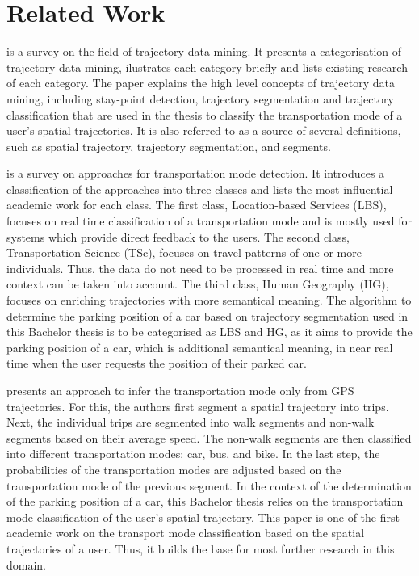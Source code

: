 \section{Related Work}

\cite{Zheng:2015:TDM:2764959.2743025} is a survey on the field of trajectory data mining. It presents a categorisation of trajectory data mining, ilustrates each category briefly and lists existing research of each category.\newline
The paper explains the high level concepts of trajectory data mining, including stay-point detection, trajectory segmentation and trajectory classification that are used in the thesis to classify the transportation mode of a user's spatial trajectories. It is also referred to as a source of several definitions, such as spatial trajectory, trajectory segmentation, and segments.

\cite{Prelipcean2017} is a survey on approaches for transportation mode detection. It introduces a classification of the approaches into three classes and lists the most influential academic work for each class. The first class, Location-based Services (LBS), focuses on real time classification of a transportation mode and is mostly used for systems which provide direct feedback to the users. The second class, Transportation Science (TSc), focuses on travel patterns of one or more individuals. Thus, the data do not need to be processed in real time and more context can be taken into account. The third class, Human Geography (HG), focuses on enriching trajectories with more semantical meaning.\newline
The algorithm to determine the parking position of a car based on trajectory segmentation used in this Bachelor thesis is to be categorised as LBS and HG, as it aims to provide the parking position of a car, which is additional semantical meaning, in near real time when the user requests the position of their parked car. 

\cite{Zheng2008} presents an approach to infer the transportation mode only from GPS trajectories. For this, the authors first segment a spatial trajectory into trips. Next, the individual trips are segmented into walk segments and non-walk segments based on their average speed. The non-walk segments are then classified into different transportation modes: car, bus, and bike. In the last step, the probabilities of the transportation modes are adjusted based on the transportation mode of the previous segment. \newline
In the context of the determination of the parking position of a car, this Bachelor thesis relies on the transportation mode classification of the user's spatial trajectory. This paper is one of the first academic work on the transport mode classification based on the spatial trajectories of a user. Thus, it builds the base for most further research in this domain.

